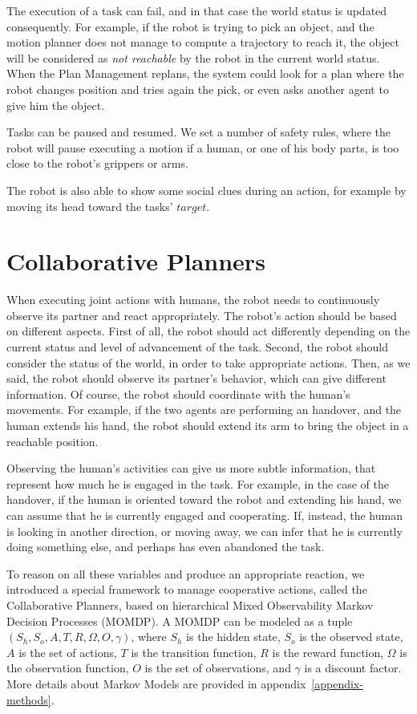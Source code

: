 The execution of a task can fail, and in that case the world status is updated consequently. For example, if the robot is trying to pick an object, and the motion planner does not manage to compute a trajectory to reach it, the object will be considered as \textit{not reachable} by the robot in the current world status. When the Plan Management replans, the system could look for a plan where the robot changes position and tries again the pick, or even asks another agent to give him the object.

Tasks can be paused and resumed. We set a number of safety rules, where the robot will pause executing a motion if a human, or one of his body parts, is too close to the robot's grippers or arms.

The robot is also able to show some social clues during an action, for example by moving its head toward the tasks' $target$. 

\section{Collaborative Planners} 
\label{sec:task_execution-collaborative_planners}
When executing joint actions with humans, the robot needs to continuously observe its partner and react appropriately. The robot's action should be based on different aspects. First of all, the robot should act differently depending on the current status and level of advancement of the task. Second, the robot should consider the status of the world, in order to take appropriate actions. Then, as we said, the robot should observe its partner's behavior, which can give different information. Of course, the robot should coordinate with the human's movements. For example, if the two agents are performing an handover, and the human extends his hand, the robot should extend its arm to bring the object in a reachable position.

Observing the human's activities can give us more subtle information, that represent how much he is engaged in the task. For example, in the case of the handover, if the human is oriented toward the robot and extending his hand, we can assume that he is currently engaged and cooperating. If, instead, the human is looking in another direction, or moving away, we can infer that he is currently doing something else, and perhaps has even abandoned the task.

To reason on all these variables and produce an appropriate reaction, we introduced a special framework to manage cooperative actions, called the Collaborative Planners, based on hierarchical Mixed Observability Markov Decision Processes (MOMDP). A MOMDP can be modeled as a tuple $(S_h,S_o,A,T,R,\Omega,O,\gamma)$, where $S_h$ is the hidden state, $S_o$ is the observed state, $A$ is the set of actions, $T$ is the transition function, $R$ is the reward function, $\Omega$ is the observation function, $O$ is the set of observations, and $\gamma$ is a discount factor. More details about Markov Models are provided in appendix~\ref{appendix-methods}.

